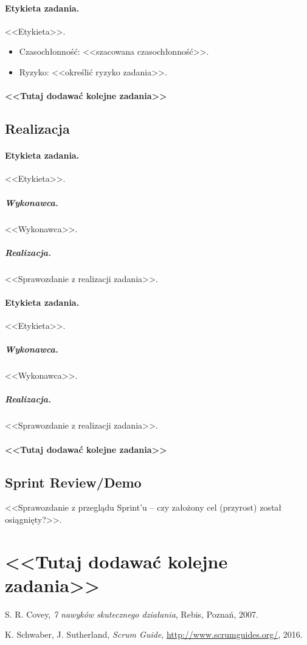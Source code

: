 \documentclass[a4paper]{amsart}
\begin{document}
\paragraph{Etykieta zadania.} <<Etykieta>>.
\begin{itemize}
\item Czasochłonność: <<szacowana czasochłonność>>.
\item{Ryzyko:} <<określić ryzyko zadania>>.
\end{itemize}

\paragraph{<<Tutaj dodawać kolejne zadania>>}

\subsection{Realizacja}

\paragraph{Etykieta zadania.} <<Etykieta>>.
\subparagraph{Wykonawca.} <<Wykonawca>>.
\subparagraph{Realizacja.} <<Sprawozdanie z realizacji zadania>>.

\paragraph{Etykieta zadania.} <<Etykieta>>.
\subparagraph{Wykonawca.} <<Wykonawca>>.
\subparagraph{Realizacja.} <<Sprawozdanie z realizacji zadania>>.

\paragraph{<<Tutaj dodawać kolejne zadania>>}


\subsection{Sprint Review/Demo}
<<Sprawozdanie z przeglądu Sprint'u -- czy założony cel (przyrost) został osiągnięty?>>.

\section*{<<Tutaj dodawać kolejne zadania>>}

\begin{thebibliography}{9}

 S. R. Covey, {\em 7 nawyków skutecznego działania}, Rebis, Poznań, 2007.

 K. Schwaber, J. Sutherland, {\em Scrum Guide}, \url{http://www.scrumguides.org/}, 2016.

\end{thebibliography}
\end{document}
